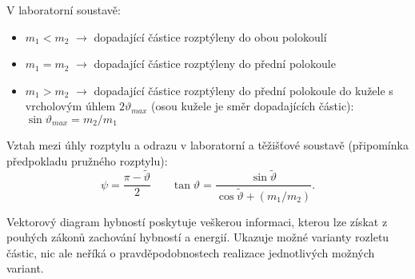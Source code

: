 \documentclass[../../main.tex]{subfiles}
\begin{document}
V laboratorní soustavě: 
\begin{itemize}
	\item $m_1 < m_2$ $\rightarrow$ dopadající částice rozptýleny do obou polokoulí
	\item $m_1 = m_2$ $\rightarrow$ dopadající částice rozptýleny do přední polokoule
	\item $m_1 > m_2$ $\rightarrow$ dopadající částice rozptýleny do přední polokoule do kužele s vrcholovým úhlem $2 \vartheta_{max}$ (osou kužele je směr dopadajících částic): $ \sin \vartheta_{max} = m_2 /m_1$	 
\end{itemize}

Vztah mezi úhly rozptylu a odrazu v laboratorní a těžišťové soustavě (připomínka předpokladu pružného rozptylu):
\begin{equation}
\psi = \dfrac{\pi - \tilde{\vartheta}}{2}   ~~~~~~~~ \tan \vartheta = \dfrac{\sin \tilde{\vartheta}}{\cos \tilde{\vartheta} + (m_1 / m_2 )}.
\end{equation}

Vektorový diagram hybností poskytuje veškerou informaci, kterou lze získat z pouhých zákonů zachování hybností a energií. Ukazuje možné varianty rozletu částic, nic ale neříká o pravděpodobnostech realizace jednotlivých možných variant. 
\end{document}
